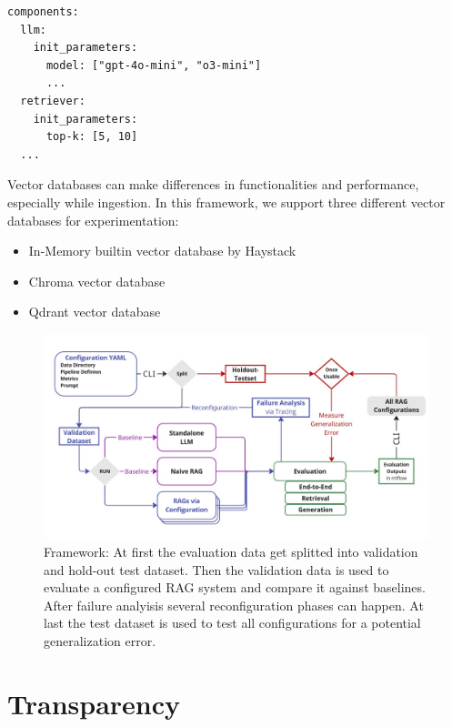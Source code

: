 \begin{verbatim}
components:
  llm:
    init_parameters:
      model: ["gpt-4o-mini", "o3-mini"]
      ...
  retriever:
    init_parameters:
      top-k: [5, 10]
  ...
\end{verbatim}


Vector databases can make differences in functionalities and performance, especially while ingestion. In this framework, we support three different vector databases for experimentation:
\begin{itemize}
  \item In-Memory builtin vector database by Haystack
  \item Chroma vector database\cite{Chroma}
  \item Qdrant vector database\cite{qdrant}
\end{itemize}


\begin{figure}[h]
  \centering
  \includegraphics[width=\textwidth]{images/FrameworkFull.pdf}
  \caption{Framework: At first the evaluation data get splitted into validation and hold-out test dataset. Then the validation data is used to evaluate a configured RAG system and compare it against baselines. After failure analyisis several reconfiguration phases can happen. At last the test dataset is used to test all configurations for a potential generalization error.}
  \label{fig:framework-full}
\end{figure}


\section{Transparency}

